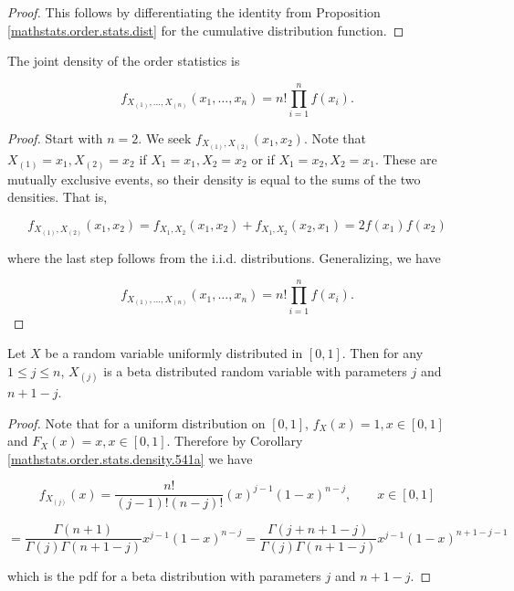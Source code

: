 \begin{proof} This follows by differentiating the identity from Proposition \ref{mathstats.order.stats.dist} for the cumulative distribution function.

\end{proof}

\begin{proposition}\label{mathstats.order.stats.density} The joint density of the order statistics is

\[
f_{X_{(1)}, \ldots, X_{(n)}}(x_1, \ldots, x_n) = n! \prod_{i=1}^n f(x_i).
\]

\end{proposition}

\begin{proof} Start with \(n=2\). We seek \(f_{X_{(1)}, X_{(2)}}(x_1,  x_2) \). Note that \(X_{(1)} = x_1, X_{(2)} = x_2\) if \(X_1 = x_1, X_2 = x_2\) or if \(X_1 = x_2, X_2 = x_1\). These are mutually exclusive events, so their density is equal to the sums of the two densities. That is,

\[
f_{X_{(1)}, X_{(2)}}(x_1,  x_2) = f_{X_1, X_2} (x_1, x_2) +  f_{X_1, X_2} (x_2, x_1) = 2 f(x_1) f(x_2)
\]

where the last step follows from the i.i.d. distributions. Generalizing, we have

\[
f_{X_{(1)}, \ldots, X_{(n)}}(x_1, \ldots, x_n) = n! \prod_{i=1}^n f(x_i).
\]

\end{proof}

\begin{proposition}\label{mathstats.orders.unif.dist}Let $X$ be a random variable uniformly distributed in $[0,1]$. Then for any $1\leq j\leq n$, $X_{(j)}$ is a beta distributed random variable with parameters $j$ and $n+1-j$. 
\end{proposition}

\begin{proof} Note that for a uniform distribution on \([0,1]\), \(f_X(x) = 1, x \in [0,1]\) and \(F_X(x) = x, x \in [0,1]\). Therefore by Corollary \ref{mathstats.order.stats.density.541a} we have

\[
f_{X_{(j)}}(x) =\frac{n!}{(j-1)!(n-j)!} (x)^{j-1}(1-x)^{n-j},\qquad x\in [0,1]
\]

\[
 =\frac{\Gamma(n+1)}{\Gamma(j) \Gamma(n+1-j)} x^{j-1}(1-x)^{n-j}  =\frac{\Gamma(j + n + 1 - j)}{\Gamma(j) \Gamma(n + 1 - j)} x^{j-1}(1-x)^{n+1-j - 1}
 \]


which is the pdf for a beta distribution with parameters \(j\) and \(n + 1 -j\). 

\end{proof}

